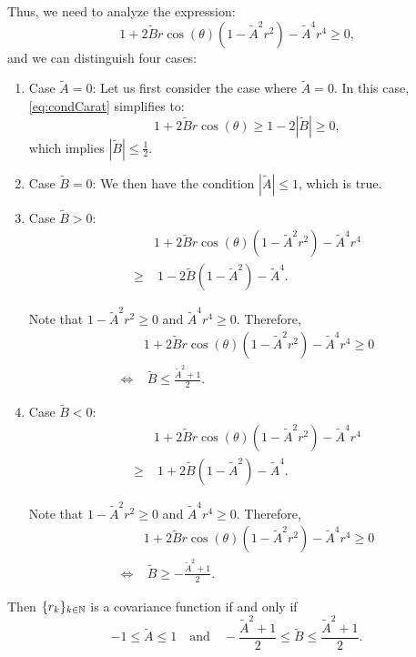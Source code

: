 Thus, we need to analyze the expression:
\begin{equation}
  \label{eq:condCarat}
    1 + 2\tilde{B}r\cos(\theta)(1-\tilde{A}^2r^2) - \tilde{A}^4r^4 \geq 0 \text{,}
\end{equation}
and we can distinguish four cases:
\begin{enumerate}
  \item Case $\tilde{A}=0$: Let us first consider the case where $\tilde{A}=0$. In this case, \eqref{eq:condCarat} simplifies to:
  \[
  1 + 2\tilde{B}r\cos(\theta) \geq 1 - 2|\tilde{B}| \geq 0,
  \]
  which implies $|\tilde{B}|\leq \frac{1}{2}$.
  
  \item Case $\tilde{B}=0$: We then have the condition $|\tilde{A}|\leq 1$, which is true.
  
  \item Case $\tilde{B}>0$: 
  \begin{align*}
        &1 + 2\tilde{B}r\cos(\theta)(1-\tilde{A}^2r^2) - \tilde{A}^4r^4 \\
        \geq & \; 1 - 2\tilde{B}(1-\tilde{A}^2) - \tilde{A}^4. 
  \end{align*}
  
  Note that $1-\tilde{A}^2r^2\geq 0$ and $\tilde{A}^4r^4 \geq 0$. Therefore,
  \begin{align*}
        &1 + 2\tilde{B}r\cos(\theta)(1-\tilde{A}^2r^2) - \tilde{A}^4r^4 \geq 0 \\
        \iff &\; \tilde{B} \leq \frac{\tilde{A}^2+1}{2}.
  \end{align*}
  
  \item Case $\tilde{B}<0$: 
  \begin{align*}
        &1 + 2\tilde{B}r\cos(\theta)(1-\tilde{A}^2r^2) - \tilde{A}^4r^4 \\
        \geq & \; 1 + 2\tilde{B}(1-\tilde{A}^2) - \tilde{A}^4. 
  \end{align*}
  
  Note that $1-\tilde{A}^2r^2 \geq 0$ and $\tilde{A}^4r^4 \geq 0$. Therefore,
  \begin{align*}
        &1 + 2\tilde{B}r\cos(\theta)(1-\tilde{A}^2r^2) - \tilde{A}^4r^4 \geq 0 \\
        \iff &\; \tilde{B} \geq - \frac{\tilde{A}^2+1}{2}.
  \end{align*}
\end{enumerate}
Then $\{r_k\}_{k \in \mathbb{N}}$ is a covariance function if and only if
  \begin{equation*}
  -1 \leq \tilde{A} \leq 1 \quad \text{and} \quad -\frac{\tilde{A}^2 +1}{2} \leq \tilde{B} \leq \frac{\tilde{A}^2 +1}{2}.
  \end{equation*}


